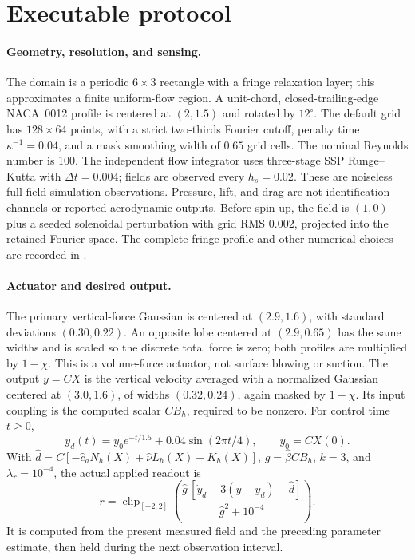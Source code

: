 \documentclass[10pt]{article}
\begin{document}
\section{Executable protocol}
\paragraph{Geometry, resolution, and sensing.}
The domain is a periodic $6\times3$ rectangle with a fringe relaxation
layer; this approximates a finite uniform-flow region. A unit-chord,
closed-trailing-edge NACA~0012 profile is centered at $(2,1.5)$ and rotated
by $12^\circ$. The default grid has $128\times64$ points, with a strict
two-thirds Fourier cutoff, penalty time $\kappa^{-1}=0.04$, and a mask
smoothing width of $0.65$ grid cells. The nominal Reynolds number is 100.
The independent flow integrator uses three-stage SSP Runge--Kutta with
$\Delta t=0.004$; fields are observed every $h_s=0.02$.
These are noiseless full-field simulation observations. Pressure, lift,
and drag are not identification channels or reported aerodynamic outputs.
Before spin-up, the field is $(1,0)$ plus a seeded solenoidal perturbation
with grid RMS $0.002$, projected into the retained Fourier space.
The complete fringe profile and other numerical choices are recorded in
.

\paragraph{Actuator and desired output.}
The primary vertical-force Gaussian is centered at $(2.9,1.6)$, with
standard deviations $(0.30,0.22)$. An opposite lobe centered at $(2.9,0.65)$
has the same widths and is scaled so the discrete total force is zero;
both profiles are multiplied by $1-\chi$. This is a volume-force actuator,
not surface blowing or suction. The output $y=CX$ is the vertical velocity
averaged with a normalized Gaussian centered at $(3.0,1.6)$, of widths
$(0.32,0.24)$, again masked by $1-\chi$. Its input coupling is the computed
scalar $CB_h$, required to be nonzero. For control time $t\geq0$,
\begin{equation}
 y_d(t)=y_0e^{-t/1.5}+0.04\sin(2\pi t/4),
 \qquad y_0=CX(0).
\end{equation}
With $\widehat d=C[-\widehat c_aN_h(X)+\widehat\nu L_h(X)+K_h(X)]$,
$\widehat g=\widehat\beta CB_h$, $k=3$, and $\lambda_r=10^{-4}$,
the actual applied readout is
\begin{equation}
 r=\operatorname{clip}_{[-2,2]}
 \left(\frac{\widehat g\,[\dot y_d-3(y-y_d)-\widehat d]}
 {\widehat g^2+10^{-4}}\right).
 \label{eq:afc_applied_control}
\end{equation}
It is computed from the present measured field and the preceding parameter
estimate, then held during the next observation interval.
\end{document}
